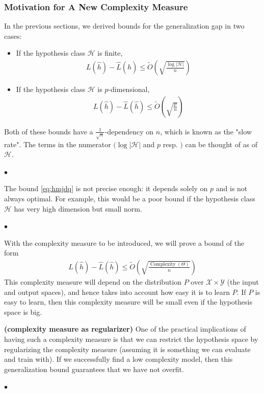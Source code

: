 \documentclass{article}
\newcommand{\bfs}[1]{\textbf{({#1}) }}
\begin{document}
\subsubsection{Motivation for A New Complexity Measure}
In the previous sections, we derived bounds for the generalization gap in two cases:
\begin{itemize}
    \item If the hypothesis class $\mathcal{H}$ is finite,
\begin{align*}
L(\hat{h})-\hat{L}(\hat{h}) \leq \tilde{O}\left(\sqrt{\frac{\log |\mathcal{H}|}{n}}\right)
\end{align*}
\item If the hypothesis class $\mathcal{H}$ is $p$-dimensional,
\begin{align}
L(\hat{h})-\hat{L}(\hat{h}) \leq \tilde{O}\left(\sqrt{\frac{p}{n}}\right)\label{eq:hmjdq}
\end{align}
\end{itemize}
Both of these bounds have a $\frac{1}{\sqrt{n}}$-dependency on $n$, which is known as the "slow rate". The terms in the numerator $(\log |\mathcal{H}|$ and $p$ resp. $)$ can be thought of as  of $\mathcal{H}$.

$\bullet$  

The bound \cref{eq:hmjdq} is not precise enough: it depends solely on $p$ and is not always optimal. For example, this would be a poor bound if the hypothesis class $\mathcal{H}$ has very high dimension but small norm. 

$\bullet$  

With the complexity measure to be introduced, we will prove a bound of the form
\begin{align*}
L(\hat{h})-\hat{L}(\hat{h}) \leq \tilde{O}\left(\sqrt{\frac{\operatorname{Complexity}(\Theta)}{n}}\right)
\end{align*}
This complexity measure will depend on the distribution $P$ over $\mathcal{X} \times \mathcal{Y}$ (the input and output spaces), and hence takes into account how easy it is to learn $P$. If $P$ is easy to learn, then this complexity measure will be small even if the hypothesis space is big.
\begin{rema}\bfs{complexity measure as regularizer}
One of the practical implications of having such a complexity measure is that we can restrict the hypothesis space by regularizing the complexity measure (assuming it is something we can evaluate and train with). If we successfully find a low complexity model, then this generalization bound guarantees that we have not overfit.
\end{rema}
$\bullet$  
\end{document}
